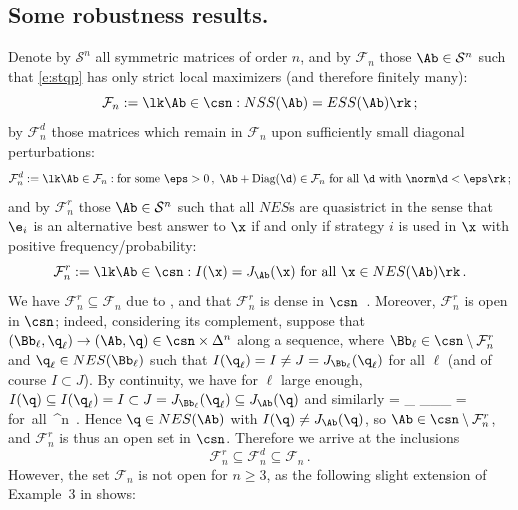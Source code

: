 \documentclass[moor]{informs3}              %
\begin{document}
\subsection{Some robustness results.}\label{secrob}

Denote by $\mathcal{S}^n$ all symmetric matrices of order $n$, and by $\mathcal{F}_n$ those $\Ab\in\mathcal{S}^n$ such that \eqref{e:stqp} has only strict local maximizers (and therefore finitely many):
$$\mathcal{F}_n := \lk \Ab\in \csn : NSS(\Ab) = ESS(\Ab)\rk\, ;$$
by $\mathcal{F}^d_{n}$ those matrices which remain in $\mathcal{F}_n$ upon sufficiently small diagonal perturbations:
$$\mathcal{F}^d_{n} := \lk \Ab\in \mathcal{F}_n : \mbox{for some }\eps>0\, , \; \Ab+\textup{Diag}(\d)\in\mathcal{F}_n \mbox{ for all }\d\mbox{ with }\norm \d < \eps\rk\, ;$$
and by $\mathcal{F}^r_{n}$ those $\Ab\in\mathcal{S}^n$ such that all $NES$s are quasistrict in the sense that $\e_i$ is an alternative best answer to $\x$ if and only if strategy $i$ is used in $\x$ with positive frequency/probability:
$$\mathcal{F}^r_{n} := \lk \Ab\in \csn : I(\x)=J_{\Ab}(\x)\mbox{ for all }\x\in NES(\Ab)\rk\, .$$
We have $\mathcal{F}^r_{n}\subseteq\mathcal{F}_n$ due to \cite[Thm.13]{Bomz02a}, and that $\mathcal{F}^r_{n}$ is dense in $\csn$~\cite[Cor.14]{Bomz02a}. Moreover, $\mathcal{F}^r_{n}$ is open in $\csn$; indeed, considering its complement, suppose that $(\Bb_\ell,\q_\ell)\to (\Ab,\q)\in \csn\times \Delta^n$ along a sequence, where $\Bb_\ell\in \csn \setminus\mathcal{F}^r_{n}$ and $\q_\ell\in NES (\Bb_\ell)$ such that $I(\q_\ell) = I \neq J = J_{\Bb_\ell}(\q_\ell)$ for all $\ell$ (and of course $I\subset J$). By continuity, we have for $\ell$ large enough,
$I(\q)\subseteq  I(\q_\ell) = I \subset J = J_{\Bb_\ell}(\q_\ell) \subseteq J_\Ab(\q)$ and similarly
 \y\T\Ab\q = \lim\limits_{\ell \to\infty} \y\T\Bb_\ell \q_\ell \le \lim\limits_{\ell \to\infty} \qf{\q_\ell}{\Bb_\ell} = \qf\q\Ab\quad\mbox{for all }\y\in \Delta^n\, .
 \eeq
Hence $\q\in NES(\Ab)$ with $I(\q)\neq J_{\Ab}(\q)$, so $\Ab\in \csn\setminus \mathcal{F}^r_{n}$, and $\mathcal{F}^r_{n}$ is thus an open set in $\csn$.
Therefore we arrive at the inclusions
$$\mathcal{F}^r_{n}\subseteq\mathcal{F}^d_{n}\subseteq\mathcal{F}_n\, .$$
However, the set $\mathcal{F}_n$ is not open for $n\ge 3$, as the following slight extension of Example~3 in \cite{Bomz02a} shows:
\end{document}
